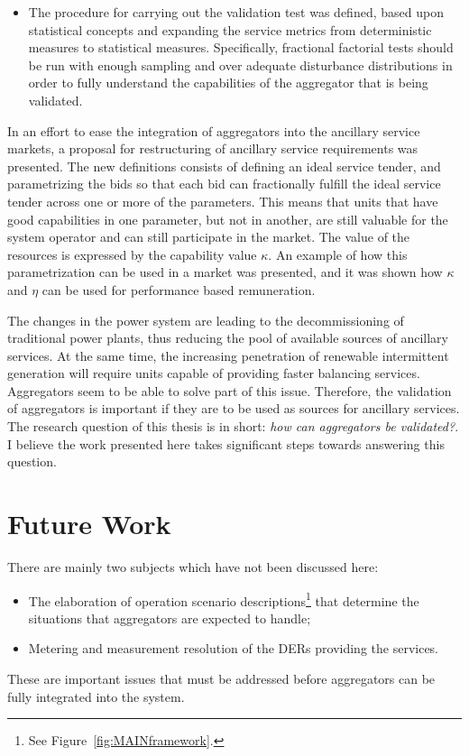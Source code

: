 \begin{description}
\begin{itemize}
			\item The procedure for carrying out the validation test was defined, based upon statistical concepts and expanding the service metrics from deterministic measures to statistical measures. Specifically, fractional factorial tests should be run with enough sampling and over adequate disturbance distributions in order to fully understand the capabilities of the aggregator that is being validated.
		\end{itemize}
\end{description}

In an effort to ease the integration of aggregators into the ancillary service markets, a proposal for restructuring of ancillary service requirements was presented. The new definitions consists of defining an ideal service tender, and parametrizing the bids so that each bid can fractionally fulfill the ideal service tender across one or more of the parameters. This means that units that have good capabilities in one parameter, but not in another, are still valuable for the system operator and can still participate in the market. The value of the resources is expressed by the capability value $\kappa$. An example of how this parametrization can be used in a market was presented, and it was shown how $\kappa$ and $\eta$ can be used for performance based remuneration.

The changes in the power system are leading to the decommissioning of traditional power plants, thus reducing the pool of available sources of ancillary services. At the same time, the increasing penetration of renewable intermittent generation will require units capable of providing faster balancing services. Aggregators seem to be able to solve part of this issue. Therefore, the validation of aggregators is important if they are to be used as sources for ancillary services. The research question of this thesis is in short: \emph{how can aggregators be validated?}. I believe the work presented here takes significant steps towards answering this question.



\section{Future Work} %
\label{sec:FutureWork}
There are mainly two subjects which have not been discussed here:
\begin{itemize}
	\item The elaboration of operation scenario descriptions\footnote{See Figure~\ref{fig:MAINframework}.} that determine the situations that aggregators are expected to handle;
	\item Metering and measurement resolution of the DERs providing the services. 
\end{itemize}
These are important issues that must be addressed before aggregators can be fully integrated into the system. 

